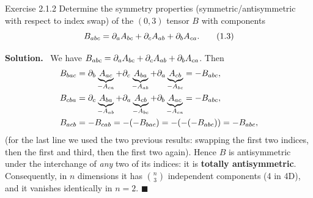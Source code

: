 \documentclass[11pt,a4paper]{article}
\numberwithin{equation}{subsection}
\newenvironment{solution}{\par\noindent\textbf{\textcolor{excol!70!black}{Solution.}}\ }{\hfill$\blacksquare$\par\medskip}
\newcommand{\added}[1]{{\color{teal!60!black}#1}}
\begin{document}
\begin{problem}{Exercise 2.1.2}
Determine the symmetry properties (symmetric/antisymmetric with respect to index swap) of the $(0,3)$ tensor $B$ with components
\[
  B_{abc}=\partial_aA_{bc}+\partial_cA_{ab}+\partial_bA_{ca}. \tag{1.3}
\]
\end{problem}
\begin{solution}
We have $B_{abc}=\partial_aA_{bc}+\partial_cA_{ab}+\partial_bA_{ca}$. Then
\begin{align*}
  B_{bac}&=\partial_b\underbrace{A_{ac}}_{-A_{ca}}+\partial_c\underbrace{A_{ba}}_{-A_{ab}}+\partial_a\underbrace{A_{cb}}_{-A_{bc}}=-B_{abc},\\
  B_{cba}&=\partial_c\underbrace{A_{ba}}_{-A_{ab}}+\partial_a\underbrace{A_{cb}}_{-A_{bc}}+\partial_b\underbrace{A_{ac}}_{-A_{ca}}=-B_{abc},\\
  B_{acb}&=-B_{cab}=-(-B_{bac})=-(-(-B_{abc}))=-B_{abc},
\end{align*}
(for the last line we used the two previous results: swapping the first two indices, then the first and third, then the first two again). Hence $B$ is antisymmetric under the interchange of \emph{any} two of its indices: it is \textbf{totally antisymmetric}. \added{Consequently, in $n$ dimensions it has $\binom n3$ independent components (4 in 4D), and it vanishes identically in $n=2$.}
\end{solution}
\end{document}
